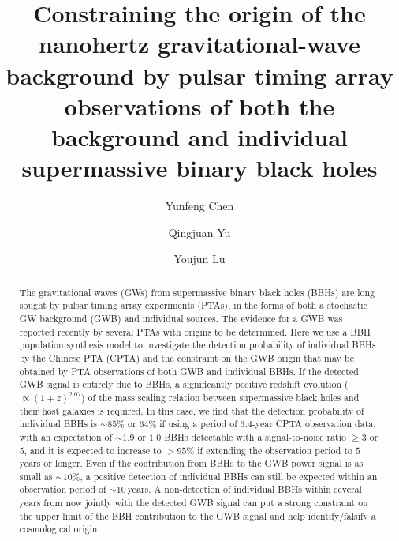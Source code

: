 \documentclass[twocolumn]{aastex631}
\begin{document}
\title{
%
Constraining the origin of the nanohertz gravitational-wave background by pulsar
timing array observations of both the background and individual supermassive
binary black holes
%
}
%
%

\author[0000-0001-5393-9853]{Yunfeng Chen} 
%
%

\author[0000-0002-1745-8064]{Qingjuan Yu}
%
%

\author[0000-0002-1310-4664]{Youjun Lu} 
%
%
%


\begin{abstract}
%
The gravitational waves (GWs) from supermassive binary black holes (BBHs) are
long sought by pulsar timing array experiments (PTAs), in the forms of both a
stochastic GW background (GWB) and individual sources. The evidence for a GWB
was reported recently by several PTAs with origins to be determined. Here we use
a BBH population synthesis model to investigate the detection probability of
individual BBHs by the Chinese PTA (CPTA) and the constraint on the GWB origin
that may be obtained by PTA observations of both GWB and individual BBHs. If the
detected GWB signal is entirely due to BBHs, a significantly positive redshift
evolution ($\propto(1+z)^{2.07}$) of the mass scaling relation between
supermassive black holes and their host galaxies is required. In this case, we
find that the detection probability of individual BBHs is $\sim85\%$ or 
64\% if using a
period of $3.4$-year CPTA observation data, with an expectation of $\sim1.9$ or
$1.0$ BBHs detectable with a signal-to-noise ratio $\geq3$ or $5$, and it is
expected to increase to $>95\%$ if extending the observation period to $5$ years
or longer. Even if the contribution from BBHs to the GWB power signal is as
small as $\sim10\%$, a positive detection of individual BBHs can still be
expected within an observation period of $\sim10$\,years. A non-detection of
individual BBHs within several years from now jointly with the detected GWB
signal can put a strong constraint on the upper limit of the BBH contribution to
the GWB signal and help identify/falsify a cosmological origin. 
%
\end{abstract}
\end{document}

